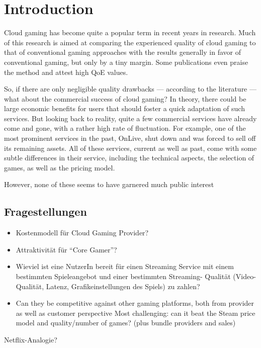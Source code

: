 

\section{Introduction}

Cloud gaming has become quite a popular term in recent years in research. Much of this research is aimed at comparing the experienced quality of cloud gaming to that of conventional gaming approaches with the results generally in favor of conventional gaming, but only by a tiny margin. Some publications even praise the method and attest high \gls{QoE} values.

So, if there are only negligible quality drawbacks --- according to the literature --- what about the commercial success of cloud gaming? In theory, there could be large economic benefits for users that should foster a quick adaptation of such services. But looking back to reality, quite a few commercial services have already come and gone, with a rather high rate of fluctuation. For example, one of the most prominent services in the past, OnLive, shut down and was forced to sell off its remaining assets. All of these services, current as well as past, come with some subtle differences in their service, including the technical aspects, the selection of games, as well as the pricing model.

However, none of these seems to have garnered much public interest

\subsection{Fragestellungen}

\begin{itemize}
	\item Kostenmodell für Cloud Gaming Provider?
	\item Attraktivität für “Core Gamer”?
	\item Wieviel ist eine NutzerIn bereit für einen Streaming Service mit einem bestimmten Spieleangebot und einer bestimmten Streaming- Qualität (Video-Qualität, Latenz, Grafikeinstellungen des Spiels) zu zahlen?
	\item Can they be competitive against other gaming platforms, both from provider as well as customer perspective
			Most challenging: can it beat the Steam price model and quality/number of games? (plus bundle providers and sales)
\end{itemize}

Netflix-Analogie? 